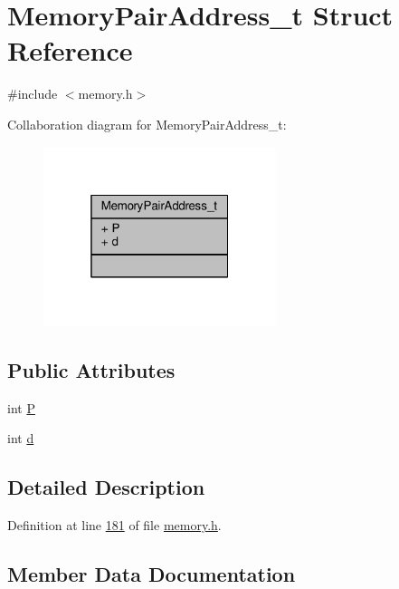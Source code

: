 \hypertarget{structMemoryPairAddress__t}{}\section{Memory\+Pair\+Address\+\_\+t Struct Reference}
\label{structMemoryPairAddress__t}


{\ttfamily \#include $<$memory.\+h$>$}



Collaboration diagram for Memory\+Pair\+Address\+\_\+t\+:
\nopagebreak
\begin{figure}[H]
\begin{center}
\leavevmode
\includegraphics[width=193pt]{structMemoryPairAddress__t__coll__graph}
\end{center}
\end{figure}
\subsection*{Public Attributes}
\begin{DoxyCompactItemize}
\item 
int \hyperlink{structMemoryPairAddress__t_a5bc11426b27565b959f280dd1a18b080}{P}
\item 
int \hyperlink{structMemoryPairAddress__t_ad608e86288286889c2658e8043414edf}{d}
\end{DoxyCompactItemize}


\subsection{Detailed Description}


Definition at line \hyperlink{memory_8h_source_l00181}{181} of file \hyperlink{memory_8h_source}{memory.\+h}.



\subsection{Member Data Documentation}
